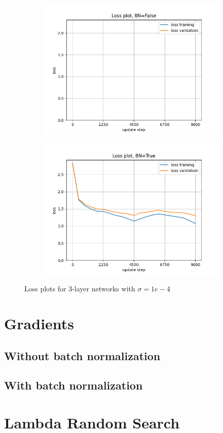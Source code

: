 \documentclass[12pt, a4paper]{article}
\begin{document}
\begin{figure}[H]
    \centering
    \begin{subfigure}{0.45\textwidth}
        \centering
        \includegraphics[width=\textwidth]{results/2-2250-3-loss-False-0.0001.png}
    \end{subfigure}
    \hfill
    \begin{subfigure}{0.45\textwidth}
        \centering
        \includegraphics[width=\textwidth]{results/2-2250-3-loss-True-0.0001.png}
    \end{subfigure}
    \caption{Loss plots for 3-layer networks with $\sigma=1e-4$}
\end{figure}

\appendix
\section{Gradients}
\label{gradientData}
\subsection{Without batch normalization}
\subsection{With batch normalization}

\section{Lambda Random Search}
\label{search}
\end{document}
